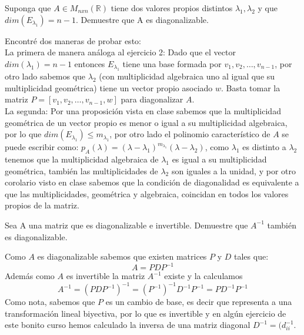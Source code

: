 \documentclass[letter]{memoir} %
\newenvironment{cframed}[1][blue]
  {\begin{tcolorbox}[colframe=#1,colback=white]}
  {\end{tcolorbox}}
\begin{document}
\begin{enumerate}
\begin{cframed}[violet]
\item Suponga que $A \in M_{nxn}(\mathbb{R})$ tiene dos valores propios distintos $\lambda_1, \lambda_2$ y que $dim(E_{\lambda_1})= n-1$. Demuestre que A es diagonalizable.
\end{cframed}
Encontré dos maneras de probar esto:\\
La primera de manera análoga al ejercicio 2: Dado que el vector $dim(\lambda_1) = n-1$ entonces $E_{\lambda_1}$ tiene una base formada por $v_1, v_2, …, v_{n-1}$, por otro lado sabemos que $\lambda_2$ (con multiplicidad algebraica uno al igual que su multiplicidad geométrica) tiene un vector propio asociado $w$. Basta tomar la matriz $P = [v_1, v_2, \dots, v_{n-1}, w]$ para diagonalizar $A$. \\
La segunda: Por una proposición vista en clase sabemos que la multiplicidad geométrica de un vector propio es menor o igual a su multiplicidad algebraica, por lo que $dim(E_{\lambda_1}) \leq m_{\lambda_1}$, por otro lado el polinomio característico de $A$ se puede escribir como: $p_A(\lambda) = (\lambda - \lambda_1)^{m_{\lambda_1}}(\lambda - \lambda_2)$, como $\lambda_1$ es distinto a $\lambda_2$ tenemos que la multiplicidad algebraica de $\lambda_1$ es igual a su multiplicidad geométrica, también las multiplicidades de $\lambda_2$ son iguales a la unidad, y por otro corolario visto en clase sabemos que la condición de diagonalidad es equivalente a que las multiplicidades, geométrica y algebraica, coincidan en todos los valores propios de la matriz. 
\begin{cframed}[teal]
\item  Sea A una matriz que es diagonalizable e invertible. Demuestre que $A^{-1}$ también es diagonalizable.
\end{cframed}
Como $A$ es diagonalizable sabemos que existen matrices $P$ y $D$ tales que:\\
\[A = P D P^{-1}\]
Además como $A$ es invertible la matriz $A^{-1}$ existe y la calculamos 
\[A^{-1} = \left(PDP^{-1}\right)^{-1} = (P^{-1} ) ^{-1} D^{-1} P^{-1}  = P D^{-1} P^{-1}\] 
Como nota, sabemos que $P$ es un cambio de base, es decir que representa a una transformación lineal biyectiva, por lo que es invertible y en algún ejercicio de este bonito curso hemos calculado la inversa de una matriz diagonal $D^{-1}=(d_{ii}^{-1}$. 


\end{enumerate}
\end{document}
